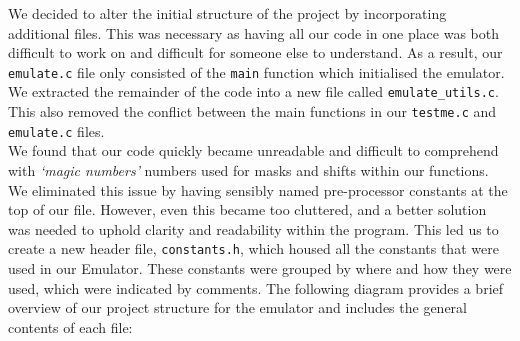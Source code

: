 \documentclass[10pt]{article}
\begin{document}
We decided to alter the initial structure of the project by incorporating additional files. This was necessary as having all our code in one place was both difficult to work on and difficult for someone else to understand. As a result, our {\tt emulate.c} file only consisted of the {\tt main} function which initialised the emulator. We extracted the remainder of the code into a new file called {\tt emulate\_utils.c}. This also removed the conflict between the main functions in our {\tt testme.c} and {\tt emulate.c} files.
 \\

We found that our code quickly became unreadable and difficult to comprehend with \textsl{‘magic numbers’} numbers used for masks and shifts within our functions. We eliminated this issue by having sensibly named pre-processor constants at the top of our file. However, even this became too cluttered, and a better solution was needed to uphold clarity and readability within the program. This led us to create a new header file, {\tt constants.h}, which housed all the constants that were used in our Emulator. These constants were grouped by where and how they were used, which were indicated by comments. The following diagram provides a brief overview of our project structure for the emulator and includes the
general contents of each file:

\vspace{0.5cm}

\end{document}
